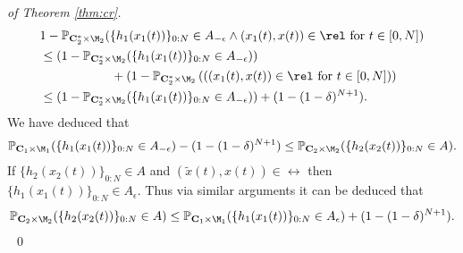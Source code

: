 \documentclass[letterpaper, 10 pt, conference]{amsart}
\theoremstyle{definition}
\theoremstyle{example}
\theoremstyle{remark}
\newcommand{\eps}{\epsilon}
\newcommand{\C}{{\mathbf{C}}}
\begin{document}
\begin{proof}[of Theorem \ref{thm:cr}]
 \begin{align*}&1-\mathbb P_{\C_2^\ast\times \M_2}(\{h_1(x_1(t))\}_{0:N}\in A_{-\eps}\wedge (x_1(t),x(t))\in \rel \mbox{ for } t\in [0,N] )\\
 &\leq (1-\mathbb P_{\C_2^\ast\times \M_2}(\{h_1(x_1(t))\}_{0:N}\in A_{-\eps} ))\\ &\hspace{2cm}
 + (1-\mathbb P_{\C_2^\ast\times \M_2} \left(((x_1(t),x(t))\in \rel \mbox{ for } t\in [0,N] )\right)\\
  &\leq (1-\mathbb P_{\C_2^\ast\times \M_2}(\{h_1(x_1(t))\}_{0:N}\in A_{-\eps} )) + (1-(1-\delta)^{N+1}). 
\end{align*}
We have deduced that 
\begin{align*}
\mathbb P_{\C_1\times \M_1}(\{h_1(x_1(t))\}_{0:N}\in A_{-\eps} )-(1-(1-\delta)^{N+1}) \leq \mathbb P_{\C_2\times \M_2}(\{h_2(x_2(t))\}_{0:N}\in A). 
\end{align*}
If $\{ h_2(x_2(t))\}_{0:N}\in A$ and $(\tilde x(t),x(t))\in \rel $ then $\{h_1(x_1(t))\}_{0:N}\in A_{\eps}$. Thus via similar arguments it can be deduced that 
\begin{align*}
\mathbb P_{\C_2\times \M_2}(\{h_2(x_2(t))\}_{0:N}\in A)
\leq 
\mathbb P_{\C_1\times \M_1}(\{h_1(x_1(t))\}_{0:N}\in A_{\eps} )+(1-(1-\delta)^{N+1}). 
\end{align*} 
\mbox{ }\qed
 \end{proof}
\end{document}
